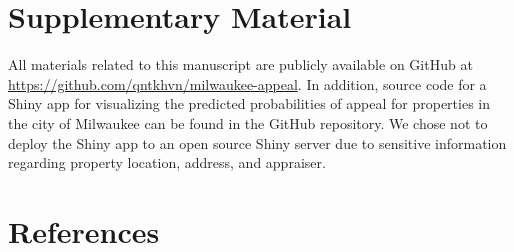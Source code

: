 \documentclass[
  12pt,
]{article}
\begin{document}
\hypertarget{supplementary-material}{%
\section*{Supplementary Material}\label{supplementary-material}}

All materials related to this manuscript are publicly available on
GitHub at \newline \url{https://github.com/qntkhvn/milwaukee-appeal}. In
addition, source code for a Shiny app for visualizing the predicted
probabilities of appeal for properties in the city of Milwaukee can be
found in the GitHub repository. We chose not to deploy the Shiny app to
an open source Shiny server due to sensitive information regarding
property location, address, and appraiser.

\hypertarget{references}{%
\section*{References}\label{references}}
\end{document}
